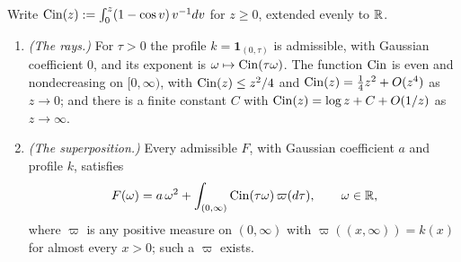 \begin{lemma}\label{lem:cin-rays}
Write $\operatorname{Cin}(z) := \int_0^z (1 - \cos v)\,v^{-1}dv$ for $z \ge 0$, extended evenly to $\mathbb{R}$.
\begin{enumerate}
\item \emph{(The rays.)} For $\tau > 0$ the profile $k = \mathbf 1_{(0,\tau)}$ is admissible,
with Gaussian coefficient $0$, and its exponent is $\omega \mapsto \operatorname{Cin}(\tau\omega)$. The
function $\operatorname{Cin}$ is even and nondecreasing on $[0,\infty)$, with $\operatorname{Cin}(z) \le z^2/4$ and
$\operatorname{Cin}(z) = \tfrac14 z^2 + O(z^4)$ as $z \to 0$; and there is a finite constant $C$ with
$\operatorname{Cin}(z) = \log z + C + O(1/z)$ as $z \to \infty$.
\item \emph{(The superposition.)} Every admissible $F$, with Gaussian coefficient $a$ and
profile $k$, satisfies
\begin{equation}\label{eq:cone-superposition}
  F(\omega) = a\,\omega^2 + \int_{(0,\infty)} \operatorname{Cin}(\tau\omega)\,\varpi(d\tau),
  \qquad \omega \in \mathbb{R},
\end{equation}
where $\varpi$ is any positive measure on $(0,\infty)$ with $\varpi((x,\infty)) = k(x)$ for
almost every $x > 0$; such a $\varpi$ exists.
\end{enumerate}
\end{lemma}

